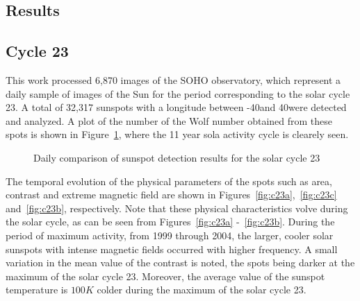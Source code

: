 \documentclass[namedreferences]{solarphysics}
\begin{document}
\begin{article}
\section{Results} %
      \label{S-results}      

\subsection{Cycle 23} %
  \label{S-cycle23}
This work processed 6,870 images of the SOHO observatory, which represent a daily sample of images of the Sun for the period corresponding to the solar cycle 23.
A total of 32,317 sunspots with a longitude between -40\degree and 40\degree were detected and analyzed.
A plot of the number of the Wolf number obtained from these spots is shown in Figure~\ref{gr:ciclo23}, where the 11 year sola activity cycle is clearely seen.

\begin{figure} [!htbp]
\caption{Daily comparison of sunspot detection results for the solar cycle 23}
\label{gr:ciclo23}
\end{figure}

The temporal evolution of the physical parameters of the spots such as area, contrast and extreme magnetic field are shown in Figures~\ref{fig:c23a},~\ref{fig:c23c} and~\ref{fig:c23b}, respectively.
Note that these physical characteristics volve during the solar cycle, as can be seen from Figures~\ref{fig:c23a} -~\ref{fig:c23b}.
During the period of maximum activity, from 1999 through 2004, the larger, cooler solar sunspots with intense magnetic fields occurred with higher frequency.
A small variation in the mean value of the contrast is noted, the spots being darker at the maximum of the solar cycle 23.
Moreover, the average value of the sunspot temperature is $100 K$ colder during the maximum of the solar cycle 23.


\end{article}
\end{document}
